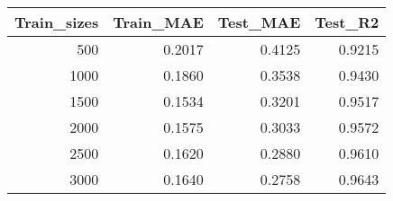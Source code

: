 \begin{tabular}{rrrr}
\toprule
Train_sizes & Train_MAE & Test_MAE & Test_R2 \\
\midrule
500 & 0.2017 & 0.4125 & 0.9215 \\
1000 & 0.1860 & 0.3538 & 0.9430 \\
1500 & 0.1534 & 0.3201 & 0.9517 \\
2000 & 0.1575 & 0.3033 & 0.9572 \\
2500 & 0.1620 & 0.2880 & 0.9610 \\
3000 & 0.1640 & 0.2758 & 0.9643 \\
\bottomrule
\end{tabular}
